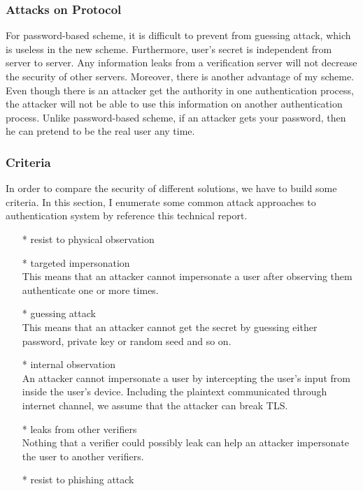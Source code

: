 \begin{CJK}{Bg5}{bsmi}
\subsubsection{Attacks on Protocol}

For password-based scheme, it is difficult to prevent from guessing attack, which is useless in the new scheme. Furthermore, user's secret is independent from server to server. Any information leaks from a verification server will not decrease the security of other servers. Moreover, there is another advantage of my scheme. Even though there is an attacker get the authority in one authentication process, the attacker will not be able to use this information on another authentication process. Unlike password-based scheme, if an attacker gets your password, then he can pretend to be the real user any time.

\subsubsection{Criteria}

In order to compare the security of different solutions, we have to build some criteria. In this section, I enumerate some common attack approaches to authentication system by reference this technical report\cite{password-extended}.
\begin{enumerate}
\item[*] resist to physical observation
\item[*] targeted impersonation
\\This means that an attacker cannot impersonate a user after observing them authenticate one or more times.
\item[*] guessing attack
\\This means that an attacker cannot get the secret by guessing either password, private key or random seed and so on.
\item[*] internal observation
\\An attacker cannot impersonate a user by intercepting the user's input from inside the user's device. Including the plaintext communicated through internet channel, we assume that the attacker can break TLS.
\item[*] leaks from other verifiers
\\Nothing that a verifier could possibly leak can help an attacker impersonate the user to another verifiers.
\item[*] resist to phishing attack
\end{enumerate}


\end{CJK}

